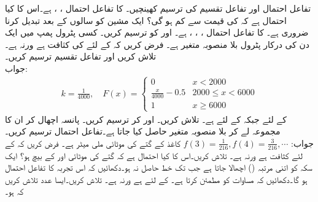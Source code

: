 \quad
تفاعل احتمال  اور تفاعل تقسیم کی ترسیم کھینچیں۔
\quad
{} کا تفاعل احتمال ، ،  ہے۔اس کا کیا احتمال ہے کہ  کی قیمت  سے کم ہو گی؟
\quad
ایک مشین کو  سالوں کے بعد تبدیل کرنا ضروری ہے۔ کا تفاعل احتمال ، ، ،  ہے۔ اور  کو ترسیم کریں۔
\quad
کسی پٹرول پمپ میں ایک دن کی درکار پٹرول بلا منصوبہ متغیر  ہے۔ فرض کریں کہ  کے لئے  کی کثافت  ہے ورنہ  ہے۔ تلاش کریں اور تفاعل تقسیم  ترسیم کریں۔\\
جواب:\quad
\begin{align*}
k=\tfrac{1}{4000},\quad 
F(x)=
\begin{cases}
0&x<2000\\
\tfrac{x}{4000}-0.5&2000\le x<6000\\
1&x\ge 6000
\end{cases}
\end{align*}
\quad
{} کے لئے  جبکہ  کے لئے  ہے۔ تلاش کریں۔  اور  کر ترسیم کریں۔
\quad
{} پانسہ اچھال کر ان کا مجموعہ لے کر بلا منصوبہ متغیر  حاصل کیا جاتا ہے۔تفاعل احتمال  ترسیم کریں۔\\
جواب:\quad
$f(3)=\tfrac{1}{216}, f(4)=\tfrac{3}{216},\cdots$
\quad
کاغذ کے گتے کی موٹائی  ملی میٹر ہے۔ فرض کریں کہ  کے لئے کثافت  ہے ورنہ  ہے۔ تلاش کریں۔اس کا کیا احتمال ہے کہ گتے کی موٹائی  اور  کے بیچ ہو؟
\quad
ایک سکہ کو اتنی مرتبہ ()  اچھالا جاتا ہے جب تک خط حاصل نہ ہو۔دکھائیں کہ اس تجربہ کا تفاعل احتمال  ہو گا۔دکھائیں کہ  مساوات  کو مطمئن کرتا ہے۔
\quad
{} کے لئے  ہے ورنہ  ہے۔ تلاش کریں۔ایسا عدد  تلاش کریں کہ  ہو۔
